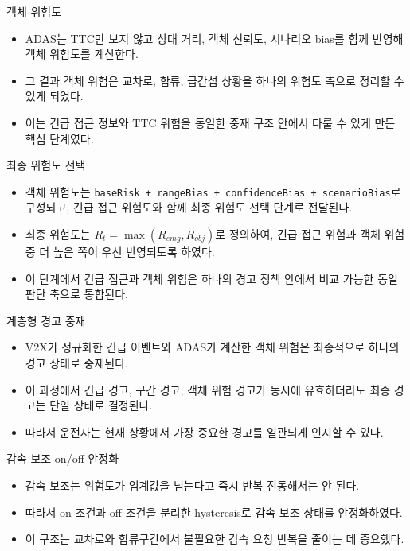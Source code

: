 \documentclass[aspectratio=169,10pt]{beamer}
\begin{document}
\begin{frame}{객체 위험도}
\small
\begin{itemize}
  \item ADAS는 TTC만 보지 않고 상대 거리, 객체 신뢰도, 시나리오 bias를 함께 반영해 객체 위험도를 계산한다.
  \item 그 결과 객체 위험은 교차로, 합류, 급간섭 상황을 하나의 위험도 축으로 정리할 수 있게 되었다.
  \item 이는 긴급 접근 정보와 TTC 위험을 동일한 중재 구조 안에서 다룰 수 있게 만든 핵심 단계였다.
\end{itemize}
\end{frame}

\begin{frame}{최종 위험도 선택}
\small
\begin{itemize}
  \item 객체 위험도는 \texttt{baseRisk + rangeBias + confidenceBias + scenarioBias}로 구성되고, 긴급 접근 위험도와 함께 최종 위험도 선택 단계로 전달된다.
  \item 최종 위험도는 \(R_t = \max(R_{emg}, R_{obj})\)로 정의하여, 긴급 접근 위험과 객체 위험 중 더 높은 쪽이 우선 반영되도록 하였다.
  \item 이 단계에서 긴급 접근과 객체 위험은 하나의 경고 정책 안에서 비교 가능한 동일 판단 축으로 통합된다.
\end{itemize}
\end{frame}

\begin{frame}{계층형 경고 중재}
\small
\begin{itemize}
  \item V2X가 정규화한 긴급 이벤트와 ADAS가 계산한 객체 위험은 최종적으로 하나의 경고 상태로 중재된다.
  \item 이 과정에서 긴급 경고, 구간 경고, 객체 위험 경고가 동시에 유효하더라도 최종 경고는 단일 상태로 결정된다.
  \item 따라서 운전자는 현재 상황에서 가장 중요한 경고를 일관되게 인지할 수 있다.
\end{itemize}
\end{frame}

\begin{frame}{감속 보조 on/off 안정화}
\small
\begin{itemize}
  \item 감속 보조는 위험도가 임계값을 넘는다고 즉시 반복 진동해서는 안 된다.
  \item 따라서 on 조건과 off 조건을 분리한 hysteresis로 감속 보조 상태를 안정화하였다.
  \item 이 구조는 교차로와 합류구간에서 불필요한 감속 요청 반복을 줄이는 데 중요했다.
\end{itemize}
\end{frame}
\end{document}
